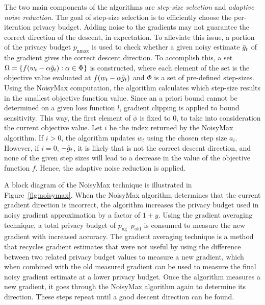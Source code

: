 The two main components of the algorithms are {\em step-size selection} and {\em adaptive noise reduction}. The goal of step-size selection is to efficiently choose the per-iteration privacy budget. Adding noise to the gradients may not guarantee the correct direction of the descent, in expectation. To alleviate this issue, a portion of the privacy budget $p_\text{nmax}$ is used to check whether a given noisy estimate $\Tilde{g}_t$ of the gradient gives the correct descent direction. To accomplish this, a set $\Omega=\{f(w_t-\alpha\Tilde{g}_t):\alpha\in\Phi\}$ is constructed, where each element of the set is the objective value evaluated at $f(w_t-\alpha\Tilde{g}_t)$ and $\Phi$ is a set of pre-defined step-sizes. Using the NoisyMax computation, the algorithm calculates which step-size results in the smallest objective function value. Since an a priori bound cannot be determined on a given loss function $l$, gradient clipping is applied to bound sensitivity. This way, the first element of $\phi$ is fixed to $0$, to take into consideration the current objective value. Let $i$ be the index returned by the NoisyMax algorithm. If $i>0$, the algorithm updates $w_t$ using the chosen step size $a_i$. However, if $i=0$, $-\Tilde{g}_t$, it is likely that is not the correct descent direction, and none of the given step sizes will lead to a decrease in the value of the objective function $f$. Hence, the adaptive noise reduction is applied.

A block diagram of the NoisyMax technique is illustrated in Figure~\ref{fig:noisymax}. When the NoisyMax algorithm determines that the current gradient direction is incorrect, the algorithm increases the privacy budget used in noisy gradient approximation by a factor of $1 + y$. Using the gradient averaging technique, a total privacy budget of $p_\text{ng} – p_\text{old}$ is consumed to measure the new gradient with increased accuracy.  The gradient averaging technique is a method that recycles gradient estimates that were not useful by using the difference between two related privacy budget values to measure a new gradient, which when combined with the old measured gradient can be used to measure the final noisy gradient estimate at a lower privacy budget. Once the algorithm measures a new gradient, it goes through the NoisyMax algorithm again to determine its direction. These steps repeat until a good descent direction can be found.

